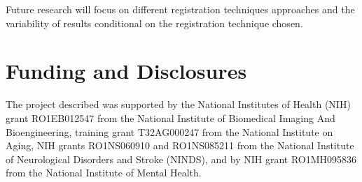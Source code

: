 \documentclass[10pt]{article}\usepackage[]{graphicx}\usepackage[]{color}
\begin{document}
Future research will focus on different registration techniques approaches and the variability of results conditional on the registration technique chosen. 












\section*{Funding and Disclosures}
The project described was supported by the National Institutes of Health (NIH) grant RO1EB012547 from the National Institute of Biomedical Imaging And Bioengineering, training grant T32AG000247 from the National Institute on Aging, NIH grants RO1NS060910 and  RO1NS085211 from the National Institute of Neurological Disorders and Stroke (NINDS), and by NIH grant RO1MH095836 from the National Institute of Mental Health. 
\end{document}
